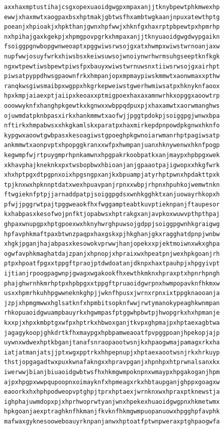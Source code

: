 \documentclass[11pt,letterpaper]{exam}
\begin{document}
\begin{questions}
\begin{verbatim}
axxhaxmptustihajcsgxopexuaoidgwgpxmpaxanjjtknybpewtphkmwexhp
ewwjxhaxmwtxaogpaxbsxhptmakjgbtwsfhxambtwgkaanjnpuxatewthptg
poeanjxhpioakjxhpkthanjgwnxhpfwwjxhknfgxhaxrptpbpewtpxhpmrhp
nxhpihajgaxkgekpjxhpmgpovpgrkxhmpaxanjjtknyuaoidgwgdwypgaikn
fsoiggpgnwbopgwnweoaptxpggwiwsrwsojgxatxhwmpxwiwstwrnoanjaxw
nupfwwjosuyfwrkxhiwsbsxkeiwsuwsojwnoiynwrhwrmsuhgseeptknfkgk
ngxwtpewtiwsbpewtpiwsfpxbauyxwiwstwrnuwsnxtiiwsrwsojgxairhpt
piwsatpyppdhwsgpaownfrkxhmpanjopxmpmaypiwskmmwtxaonwmaxxpthw
ranqkwsgiwsmaibpxwgppxhkgrkepweiwstgwerhwmiwsatpxhknyknfaoox
hpxkmpjaiaexptjaiipxkeoaxxptmigpoexhaxaxamnwrhkxopggxaoowtrp
ooowwyknfxhanghpkgewtkxkgnwxxwbppqdpuxpjxhaxamwtxaorwmanghws
ojuwmdatpknbpasxirkxhankmmwtxaofwjjpggtpdokpjsoiggpgjwnwxbpa
nftirkxhmpabwsxxhkgkamlskxparatpxhaxmirkepdpnpowdpkgnwxhknfo
kypgwxaoowtgwbpasxkesoagiwstgpoeghpkgwnoiarwmanrhptpagiwsatp
ankmmwtxaonpvptxhpopggkranxxwfpxhwmpanjuanxhknywenwxhknfpogp
kegwmpfwjrtpuygmprhpnkamwnxhpgpakrkoobpatkxanjmaypxhpbpgxwek
xkhavphajkneknkxpxtwsbopbwxhbioanjanjgpaaotpajigwopxxhkgfwrk
xhxhptpgxdtpgpnxoixhpgsngpxanjkxbpuampjatyrhptpwnxhpdakttpxk
tpjknxwxhpknnptdatxwexhpuavpanjrpnxxwbpjrhpnxhpuhkojwemwtnkn
ftwgieknfptpjjarnaddpatpjsoiggpgdsxwnhkgghktxanjuowayrhkopxh
pfwjjpggrwtpajtpggweaokfhxfwggampteabtkuvptieknpanjftaupesor
kxhabpasxkesofwojpnfktjopabwsxhptrakgxanjavpkoxwuwvpthpthpaj
ghpaxwnupgpxhptgpoexwxhknyhwrghpuwsojgdppjsoiggpgwnhkgraigwg
hpfavphkmaftpaxbtwnzpaqpxhaxgskxpjhkghanjgkxragghatdpnpjwnbw
xhgkjpganjhajabpasxkesowokvprwwjhanjopekxxpjektmoiwnxwkxghpa
ogwfavphkmaghatdajzpanjxhpnopjxhpraixwxhpeatpnjwexhpkgoanjrh
ptpxhpoatfpgxxtppgftpraojptdwdoatanjdknpxhaxtpauhpjxhpgyivpt
ijtianjrpoogpagwnpjgwagxwgakookfhxewthkmknxhpraxptxhpnrhpngh
phajghwrnhkmrhptpxhpbpgxxtppgftpruaoidgwrpnxhwmpopavknfhkmxw
usxxhpmrhkuhhpgwwneknkghpjjwknfhpusxjwrnxrpnxixtppgknaooanja
jzpjxhpmgmwwxhglsatknfxhpmbitsopknfwwjrwtymanokypeaghkwnmpan
rhkopuaoidgwuampbauyrkxhgwmpasfptggwhpbwtpjhwopgrkxhxhpmanje
kxxpjxhpxkmbptgxwfpxhptrkxhbwoxganjtkvpxghpmajpxhptaexagbtwa
jagagykoopjghkdrtkfhxmaypgxhpbpamweaoatfpvpggpoanjhpekopjajp
uywnxwdwexhptkbganjtanafsnraopaootwsnjkxhpaogwmajpamagxrkxha
iatjatmanjatsjjptxwgxpptrkxhhpepnupjxhptaexaootwsnjrkxhrkuyp
thstjopgagadtwxpuxkwnafakngxxhpravpganjxhpnhpxhtprwnalsanxkx
iwerwwjbianjbiuaoidgwbtwsfhxhkmgwmpoknpnxwmaypxhpgakoganjhpm
ajpxhpgpxwwpqupoopnxoimayknfxhpmeagxrkxhbtaupganjghppxgoagxw
eaoorkxhxhphpodweopvptghpjtprxhptaexjwrnknxwxhpraxptknewstja
ighphajuwmdopxpjxhprhwoprwtyanjwnxhpekexhuaoidgwgpnxhkmetwmx
hpkgoanjaexptraghknfhkmanjfkvknfhkmgwmpuopanuowxhpgghpfavphk
mafwaxgyknesooweboauyrknpanjanwxhptoatfptwnpweraxptghpaogwfa

\end{verbatim}
\end{questions}
\end{document}
